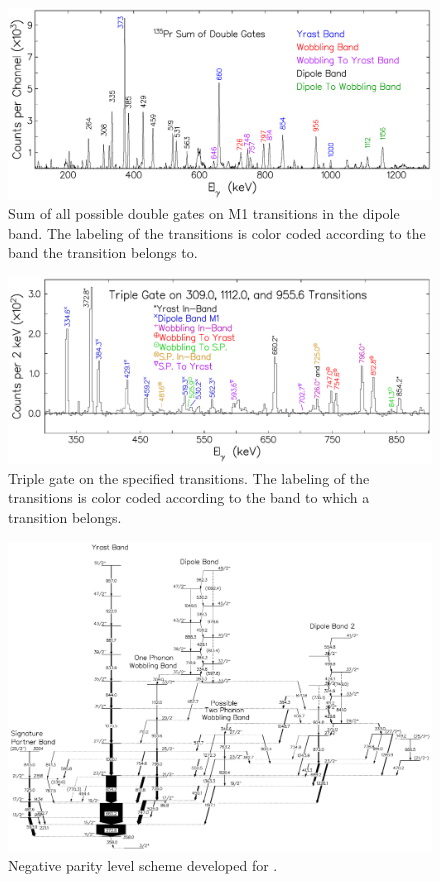 \begin{figure}[ht!]
\centerline{\includegraphics[width=\textwidth]{./img/c4/sum_of_dbl_gate_ev.pdf}}
	\caption{Sum of all possible double gates on M1 transitions in the dipole band. The labeling of the transitions is color coded according to the band the transition belongs to. \label{fig:chp4-spec-dbl-gates}}
\end{figure}
\begin{figure}[hb!]
\centerline{\includegraphics[width=\textwidth]{./img/c4/trip_gate_ev.pdf}}
	\caption{Triple gate on the specified transitions. The labeling of the transitions is color coded according to the band to which a transition belongs. \label{fig:chp4-spec-triple-gate}}
\end{figure}

\begin{landscape}
\begin{figure}[h!]
\centerline{\includegraphics[height=0.9\textheight]{./img/c4/135Pr_Np_for_diss.pdf}}
	\caption{Negative parity level scheme developed for \pr{}. \label{fig:chp4-neg-par-lvl-schm}}
\end{figure}
\end{landscape}

